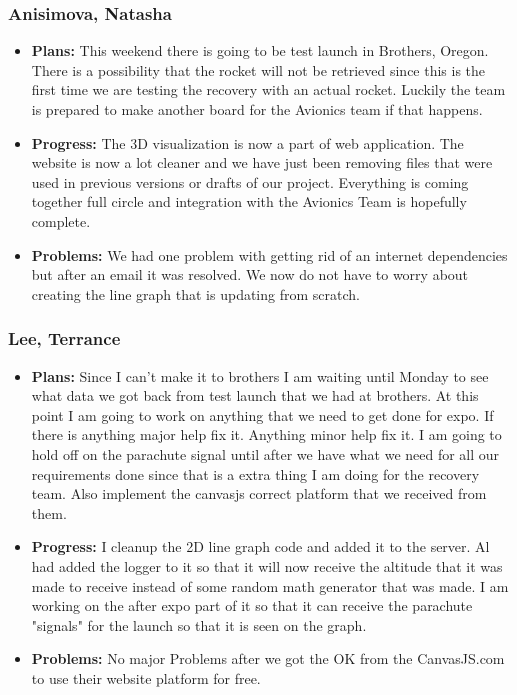 \documentclass[10pt,draftclsnofoot,onecolumn]{IEEEtran}
\begin{document}
\subsubsection{Anisimova, Natasha}
\begin{itemize}
	\item \textbf{Plans: }
	This weekend there is going to be test launch in Brothers, Oregon. There is a possibility that the rocket will not be retrieved since this is the first time we are testing the recovery with an actual rocket. Luckily the team is prepared to make another board for the Avionics team if that happens.
	\item \textbf{Progress:  }
	The 3D visualization is now a part of web application. The website is now a lot cleaner and we have just been removing files that were used in previous versions or drafts of our project. Everything is coming together full circle and integration with the Avionics Team is hopefully complete.
	\item \textbf{Problems: }
	We had one problem with getting rid of an internet dependencies but after an email it was resolved. We now do not have to worry about creating the line graph that is updating from scratch.
\end{itemize}

\subsubsection{Lee, Terrance}
\begin{itemize}
	\item \textbf{Plans: }
	Since I can't make it to brothers I am waiting until Monday to see what data we got back from test launch that we had at brothers. At this point I am going to work on anything that we need to get done for expo. If there is anything major help fix it. Anything minor help fix it. I am going to hold off on the parachute signal until after we have what we need for all our requirements done since that is a extra thing I am doing for the recovery team. Also implement the canvasjs correct platform that we received from them.
	\item \textbf{Progress:  }
	I cleanup the 2D line graph code and added it to the server. Al had added the logger to it so that it will now receive the altitude that it was made to receive instead of some random math generator that was made. I am working on the after expo part of it so that it can receive the parachute "signals" for the launch so that it is seen on the graph.
	\item \textbf{Problems: }
	No major Problems after we got the OK from the CanvasJS.com to use their website platform for free.
\end{itemize}
\end{document}
